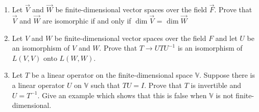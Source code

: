 \begin{enumerate}[label=\thesubsection.\arabic*.,ref=\thesubsection.\theenumi]
\begin{enumerate}
\end{enumerate}
\item Let $\vec{V}$ and $\vec{W}$ be finite-dimensional vector spaces over the field $\vec{F}$. Prove that $\vec{V}$ and $\vec{W}$ are isomorphic if and only if $\dim{\vec{V}}$ = $\dim{\vec{W}}$
%
\\
\solution

\item Let $V$ and $W$ be finite-dimensional vector spaces over the field $F$ and let $U$ be an isomorphism of $V$ and $W$. Prove that $T \rightarrow UTU^{-1}$ is an isomorphism of $L(V,V)$ onto $L(W,W)$.
%
\\
\solution

%
\item Let $T$ be a linear operator on the finite-dimensional space $\mathbb{V}$. Suppose there is a linear operator $U$ on $\mathbb{V}$ such that $TU = I$. Prove that $T$ is invertible and $U = T^{-1}$. Give an example which shows that this is false when $\mathbb{V}$ is not finite-dimensional.
%
\\
\solution

\end{enumerate}
